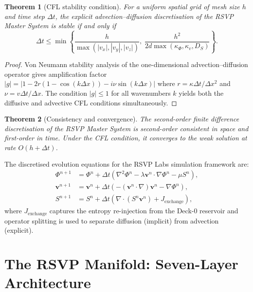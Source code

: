 \documentclass[12pt, a4paper]{article}
\theoremstyle{plain}
\newtheorem{theorem}{Theorem}[section]
\theoremstyle{definition}
\theoremstyle{remark}
\newcommand{\vfield}{\mathbf{v}}
\begin{document}
\begin{theorem}[CFL stability condition]
\label{thm:cfl}
For a uniform spatial grid of mesh size $h$ and time step $\Delta t$, the explicit
advection--diffusion discretisation of the RSVP Master System is stable if and only if
\[
\Delta t \leq \min\!\left\{\frac{h}{\max(|v_x|,|v_y|,|v_z|)},
\;\frac{h^2}{2d\max(\kappa_\Phi, \kappa_v, D_S)}\right\}.
\]
\end{theorem}

\begin{proof}
Von Neumann stability analysis of the one-dimensional advection--diffusion operator gives
amplification factor $|g| = |1 - 2r(1-\cos(k\Delta x)) - i\nu\sin(k\Delta x)|$ where
$r = \kappa\Delta t/\Delta x^2$ and $\nu = v\Delta t/\Delta x$.  The condition $|g|\leq 1$
for all wavenumbers $k$ yields both the diffusive and advective CFL conditions
simultaneously.
\end{proof}

\begin{theorem}[Consistency and convergence]
The second-order finite difference discretisation of the RSVP Master System is
second-order consistent in space and first-order in time.  Under the CFL condition,
it converges to the weak solution at rate $O(h + \Delta t)$.
\end{theorem}

The discretised evolution equations for the RSVP Labs simulation framework are:
\begin{align}
\Phi^{n+1} &= \Phi^n + \Delta t\!\left(\nabla^2\Phi^n - \lambda\vfield^n\cdot\nabla\Phi^n - \mu S^n\right),\\
\vfield^{n+1} &= \vfield^n + \Delta t\!\left(-(\vfield^n\cdot\nabla)\vfield^n - \nabla\Phi^n\right),\\
S^{n+1} &= S^n + \Delta t\!\left(\nabla\cdot(S^n\vfield^n) + J_{\mathrm{exchange}}\right),
\end{align}
where $J_{\mathrm{exchange}}$ captures the entropy re-injection from the Deck-0 reservoir
and operator splitting is used to separate diffusion (implicit) from advection (explicit).

\section{The RSVP Manifold: Seven-Layer Architecture}
\label{sec:manifold}
\end{document}
